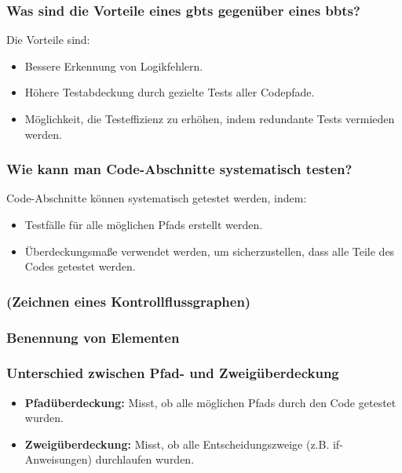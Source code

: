 \documentclass[main.tex]{subfiles}
\begin{document}
\subsubsection*{Was sind die Vorteile eines \glspl{gbt}  gegenüber eines \glspl{bbt}?}
Die Vorteile sind:
\begin{itemize}
    \item Bessere Erkennung von Logikfehlern.
    \item Höhere Testabdeckung durch gezielte Tests aller Codepfade.
    \item Möglichkeit, die Testeffizienz zu erhöhen, indem redundante Tests vermieden werden.
\end{itemize}

\subsubsection*{Wie kann man Code-Abschnitte systematisch testen?}
Code-Abschnitte können systematisch getestet werden, indem:
\begin{itemize}
    \item Testfälle für alle möglichen \glspl{Pfad} erstellt werden.
    \item Überdeckungsmaße verwendet werden, um sicherzustellen, dass alle Teile des Codes getestet werden.
\end{itemize}

\subsubsection*{(Zeichnen eines Kontrollflussgraphen)} %

\subsubsection*{Benennung von Elementen} %

\subsubsection*{Unterschied zwischen \gls{Pfad}- und \gls{Zweigüberdeckung}}
\begin{itemize}
    \item \textbf{\gls{Pfadüberdeckung}:} Misst, ob alle möglichen \glspl{Pfad} durch den Code getestet wurden.
    \item \textbf{\gls{Zweigüberdeckung}:} Misst, ob alle Entscheidungszweige (z.B. if-Anweisungen) durchlaufen wurden.
\end{itemize}
\end{document}
